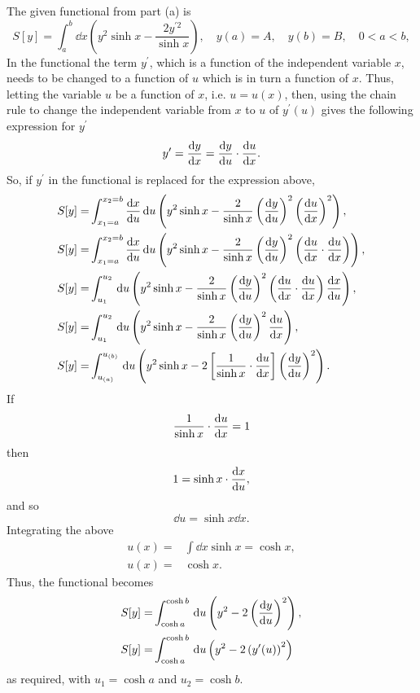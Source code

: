 The given functional from part (a) is
\[
	S[y] = \int_a^b \dd x\left(y^2\sinh x -\frac{2y^{\prime 2}}{\sinh x}\right),\quad y(a) = A,\quad y(b) = B,\quad 0< a < b,
\]
In the functional the term $y^\prime$, which is a function of the independent variable $x$, needs to be changed to a function of $u$ which is in turn a function of $x$. Thus, letting the variable $u$ be a function of $x$, i.e. $u=u(x)$, then, using the chain rule to change the independent variable from $x$ to $u$ of $y^\prime(u)$ gives the following expression for $y^\prime$
\[
	y^\prime = \frac{\mathrm{d}y}{\mathrm{d}x} = \frac{\mathrm{d}y}{\mathrm{d}u}\cdot\frac{\mathrm{d}u}{\mathrm{d}x}.
\]
So, if $y^\prime$ in the functional is replaced for the expression above, 
\begin{equation*}
\begin{split}
	S[y] =& \int_{x_1=a}^{x_2=b}\frac{\mathrm{d}x}{\mathrm{d}u}\, \mathrm{d} u\left(y^2\sinh x-\frac{2}{\sinh x}\left(\frac{\mathrm{d}y}{\mathrm{d}u}\right)^2\left(\frac{\mathrm{d}u}{\mathrm{d}x}\right)^2\right),\\
	S[y] =& \int_{x_1=a}^{x_2=b}\frac{\mathrm{d}x}{\mathrm{d}u}\, \mathrm{d} u\left(y^2\sinh x-\frac{2}{\sinh x}\left(\frac{\mathrm{d}y}{\mathrm{d}u}\right)^2\left(\frac{\mathrm{d}u}{\mathrm{d}x}\cdot\frac{\mathrm{d}u}{\mathrm{d}x}\right)\right),\\
	S[y] =& \int_{u_1}^{u_2}\, \mathrm{d} u\left(y^2\sinh x-\frac{2}{\sinh x}\left(\frac{\mathrm{d}y}{\mathrm{d}u}\right)^2\left(\frac{\mathrm{d}u}{\mathrm{d}x}\cdot\frac{\mathrm{d}u}{\mathrm{d}x}\right)\frac{\mathrm{d}x}{\mathrm{d}u}\right),\\
	S[y] =& \int_{u_1}^{u_2}\, \mathrm{d} u\left(y^2\sinh x-\frac{2}{\sinh x}\left(\frac{\mathrm{d}y}{\mathrm{d}u}\right)^2\frac{\mathrm{d}u}{\mathrm{d}x}\right),\\
	S[y] =& \int_{u_{(a)}}^{u_{(b)}}\, \mathrm{d} u\left(y^2\sinh x-2\left[\frac{1}{\sinh x}\cdot\frac{\mathrm{d}u}{\mathrm{d}x}\right]\left(\frac{\mathrm{d}y}{\mathrm{d}u}\right)^2\right).
\end{split}
\end{equation*}
If
\[
	\frac{1}{\sinh x}\cdot\frac{\mathrm{d}u}{\mathrm{d}x} = 1
\]
then
\[
	1 = \sinh x\cdot\frac{\mathrm{d}x}{\mathrm{d}u},
\]
and so
\[
	\dd u = \sinh x \dd x.
\]
Integrating the above
\begin{equation*}
\begin{split}
	u(x) =& \int \dd x \sinh x = \cosh x,\\
	u(x) =& \cosh x.
\end{split}
\end{equation*}
Thus, the functional becomes
\begin{align}
	S[y] =& \int_{\cosh a}^{\cosh b}\, \mathrm{d} u \left(y^2 -2\left(\frac{\mathrm{d}y}{\mathrm{d}u}\right)^2\right),\nonumber\\
	\label{eq:1.1}
	S[y] =& \int_{\cosh a}^{\cosh b}\, \mathrm{d} u \left(y^2-2\left(y^\prime(u)\right)^2\right)
\end{align}
as required, with $u_1=\cosh a$ and $u_2=\cosh b$.